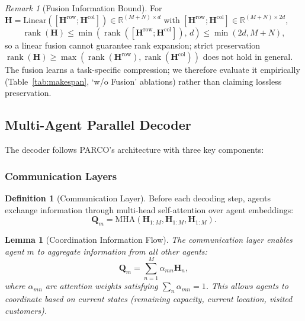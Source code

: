 \documentclass[journal,twoside,web]{ieeecolor}
\newtheorem{lemma}[theorem]{Lemma}
\theoremstyle{definition}
\newtheorem{definition}[theorem]{Definition}
\theoremstyle{remark}
\newtheorem{remark}[theorem]{Remark}
\theoremstyle{definition}
\DeclareMathOperator{\rank}{rank}
\begin{document}
\begin{remark}[Fusion Information Bound]
For $\mathbf{H}=\text{Linear}([\mathbf{H}^{\text{row}};\mathbf{H}^{\text{col}}])\in\mathbb{R}^{(M+N)\times d}$ with $[\mathbf{H}^{\text{row}};\mathbf{H}^{\text{col}}]\in\mathbb{R}^{(M+N)\times 2d}$,
\begin{equation}
\rank(\mathbf{H}) \le \min\!\left(\rank([\mathbf{H}^{\text{row}};\mathbf{H}^{\text{col}}]),\, d\right) \le \min(2d, M+N),
\end{equation}
so a linear fusion cannot guarantee rank expansion; strict preservation $\rank(\mathbf{H})\ge\max(\rank(\mathbf{H}^{\text{row}}),\rank(\mathbf{H}^{\text{col}}))$ does not hold in general. The fusion learns a task-specific compression; we therefore evaluate it empirically (Table~\ref{tab:makespan}, `w/o Fusion' ablations) rather than claiming lossless preservation.
\end{remark}

\subsection{Multi-Agent Parallel Decoder}

The decoder follows PARCO's architecture with three key components:

\subsubsection{Communication Layers}
\begin{definition}[Communication Layer]
Before each decoding step, agents exchange information through multi-head self-attention over agent embeddings:
\begin{equation}
\mathbf{Q}_m = \text{MHA}(\mathbf{H}_{1:M}, \mathbf{H}_{1:M}, \mathbf{H}_{1:M}).
\end{equation}
\end{definition}

\begin{lemma}[Coordination Information Flow]
The communication layer enables agent $m$ to aggregate information from all other agents:
\begin{equation}
\mathbf{Q}_m = \sum_{n=1}^M \alpha_{mn} \mathbf{H}_n,
\end{equation}
where $\alpha_{mn}$ are attention weights satisfying $\sum_n \alpha_{mn} = 1$. This allows agents to coordinate based on current states (remaining capacity, current location, visited customers).
\end{lemma}
\end{document}
